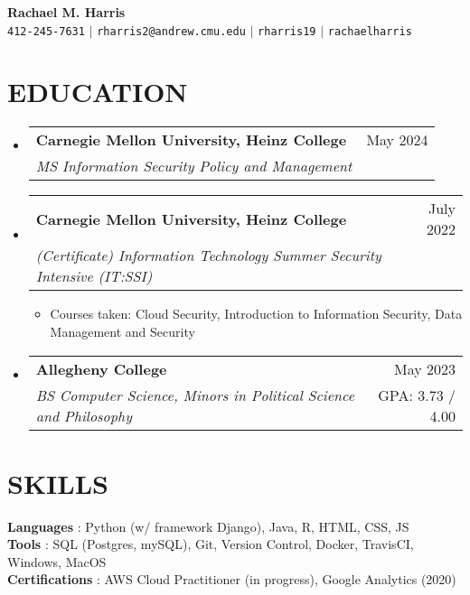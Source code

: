 \documentclass[letterpaper,11pt]{article}
\makeatletter
\newcommand{\resumeItem}[1]{
  \item\small{
    {#1 \vspace{-1pt}}
  }
}
\newcommand{\resumeSubheading}[4]{
  \vspace{-1pt}\item
    \begin{tabular*}{\textwidth}[t]{l@{\extracolsep{\fill}}r}
      \textbf{#1} & {\color{dark-grey}\small #2}\vspace{1pt}\\ %
      \textit{#3} & {\color{dark-grey} \small #4}\\ %
    \end{tabular*}\vspace{-4pt}
}
\newcommand{\resumeSubHeadingListStart}{\begin{itemize}[leftmargin=0in, label={}]}
\newcommand{\resumeSubHeadingListEnd}{\end{itemize}}
\newcommand{\resumeItemListStart}{\begin{itemize}}
\newcommand{\resumeItemListEnd}{\end{itemize}\vspace{0pt}}
\makeatother
\begin{document}
\begin{center}
    \textbf{\Huge Rachael M. Harris} \\ \vspace{5pt}
    \small \faPhone* \texttt{412-245-7631} \hspace{1pt} $|$
    \hspace{1pt} \faEnvelope \hspace{2pt} \texttt{rharris2@andrew.cmu.edu} \hspace{1pt} $|$ 
    \hspace{1pt} \faLinkedin \hspace{2pt} \texttt{rharris19} \hspace{1pt} $|$
    \hspace{1pt} \faGithub \hspace{2pt}\texttt{rachaelharris}
    \\ \vspace{-3pt}
\end{center}

\section{EDUCATION}
  \resumeSubHeadingListStart
    \resumeSubheading
      {Carnegie Mellon University, Heinz College}{May 2024}
      {MS Information Security Policy and Management}{}
    \resumeSubheading{Carnegie Mellon University, Heinz College}{July 2022}{(Certificate) Information Technology Summer Security Intensive (IT:SSI)}{}
    \resumeItemListStart
    \resumeItem{Courses taken: Cloud Security, Introduction to Information Security, Data Management and Security
    }
    \resumeItemListEnd
    \resumeSubheading
      {Allegheny College}{May 2023}
      {BS Computer Science, Minors in Political Science and Philosophy}{GPA: 3.73 / 4.00}
  \resumeSubHeadingListEnd
  
\section{SKILLS}
 \begin{itemize}[leftmargin=0in, label={}]
    \small{\item{
     \textbf{Languages} {: Python (w/ framework Django), Java, R, HTML, CSS, JS}\vspace{2pt} \\
     \textbf{Tools}     {: SQL (Postgres, mySQL), Git, Version Control, Docker, TravisCI, Windows, MacOS} \\
     \textbf{Certifications}     {: AWS Cloud Practitioner (in progress), Google Analytics (2020)}
    }}
 \end{itemize}
\end{document}
